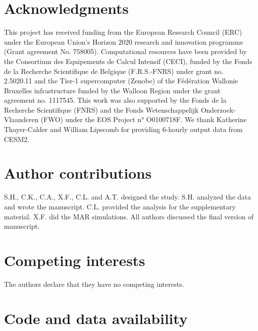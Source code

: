 \documentclass[12pt]{article}
\begin{document}
\nolinenumbers
\cleardoublepage
\printbibliography[keyword=methods, title={Methods References}]



\section*{Acknowledgments}
This project has received funding from the European Research Council (ERC) under the European Union’s Horizon 2020 research and innovation programme (Grant agreement No. 758005). Computational resources have been provided by the Consortium des Equipements de Calcul Intensif (CECI), funded by the Fonds de la Recherche Scientifique de Belgique (F.R.S.-FNRS) under grant no. 2.5020.11 and the Tier-1 supercomputer (Zenobe) of the Fédération Wallonie Bruxelles infrastructure funded by the Walloon Region under the grant agreement no. 1117545. This work was also supported by the Fonds de la Recherche Scientifique (FNRS) and the Fonds Wetenschappelijk Onderzoek-Vlaanderen (FWO) under the EOS Project n° O0100718F. 
We thank Katherine Thayer-Calder and William Lipscomb for providing 6-hourly output data from CESM2.

\section*{Author contributions}

S.H., C.K., C.A., X.F., C.L. and A.T. designed the study. S.H. analyzed the data and wrote the manuscript. C.L. provided the analysis for the supplementary material. X.F. did the MAR simulations. All authors discussed the final version of manuscript.

\section*{Competing interests}
The authors declare that they have no competing interests.

\section*{Code and data availability}
\end{document}
